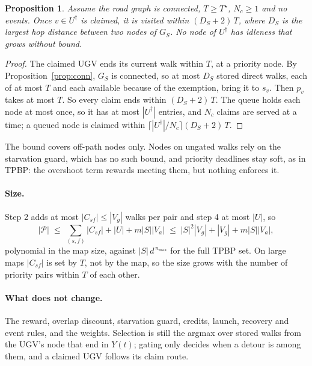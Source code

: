 \documentclass[11pt]{article}
\theoremstyle{definition}
\theoremstyle{plain}
\newtheorem{proposition}{Proposition}
\begin{document}
\begin{proposition}
\label{prop:claim}
Assume the road graph is connected, $T \geq T^\star$, $N_c \geq 1$ and no
events. Once $v \in U^\dagger$ is claimed, it is visited within $(D_S + 2)\,
T$, where $D_S$ is the largest hop distance between two nodes of $G_S$. No
node of $U^\dagger$ has idleness that grows without bound.
\end{proposition}
\begin{proof}
The claimed UGV ends its current walk within $T$, at a priority node. By
Proposition~\ref{prop:conn}, $G_S$ is connected, so at most $D_S$ stored
direct walks, each of at most $T$ and each available because of the
exemption, bring it to $s_v$. Then $p_v$ takes at most $T$. So every claim
ends within $(D_S + 2)\, T$. The queue holds each node at most once, so it
has at most $|U^\dagger|$ entries, and $N_c$ claims are served at a time; a
queued node is claimed within $\lceil |U^\dagger| / N_c \rceil (D_S + 2)\,
T$.
\end{proof}

The bound covers off-path nodes only. Nodes on ungated walks rely on the
starvation guard, which has no such bound, and priority deadlines stay
soft, as in TPBP: the overshoot term rewards meeting them, but nothing
enforces it.

\paragraph{Size.} Step 2 adds at most $|C_{sf}| \leq |V_g|$ walks per pair
and step 4 at most $|U|$, so
\begin{equation}
|\mathcal{P}| \;\leq\; \sum_{(s, f)} |C_{sf}| + |U| + m|S||V_a| \;\leq\;
|S|^2 |V_g| + |V_g| + m|S||V_a| ,
\end{equation}
polynomial in the map size, against $|S|\,d^{\,n_{\max}}$ for the full TPBP
set. On large maps $|C_{sf}|$ is set by $T$, not by the map, so the size grows
with the number of priority pairs within $T$ of each other.

\paragraph{What does not change.} The reward, overlap discount, starvation
guard, credits, launch, recovery and event rules, and the weights. Selection
is still the argmax over stored walks from the UGV's node that end in
$Y(t)$; gating only decides when a detour is among them, and a claimed UGV
follows its claim route.
\end{document}
